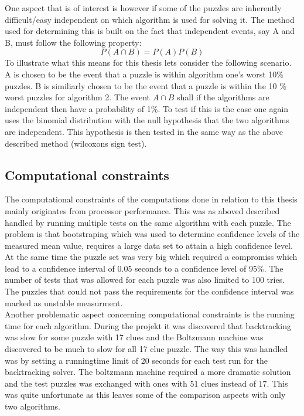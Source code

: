 \documentclass[a4paper,11pt]{kth-mag}
\begin{document}
One aspect that is of interest is however if some of the puzzles are inherently difficult/easy independent on which algorithm is used for solving it.
The method used for determining this is built on the fact that independent events, say A and B, must follow the following property:
\[
P(A \cap B) = P(A) P(B)
\] 
To illustrate what this means for this thesis lets consider the following scenario.
A is chosen to be the event that a puzzle is within algorithm one's worst 10\% puzzles.
B is similiarly chosen to be the event that a puzzle is within the 10 \% worst puzzles for algorithm 2.
The event $A \cap B$ shall if the algorithms are independent then have a probability of 1\%.
To test if this is the case one again uses the binomial distribution with the null hypothesis that the two algorithms are independent.
This hypothesis is then tested in the same way as the above described method (wilcoxons sign test).

\FloatBarrier
\subsection{Computational constraints}
The computational constraints of the computations done in relation to this thesis mainly originates from processor performance.
This was as aboved described handled by running multiple tests on the same algorithm with each puzzle.
The problem is that bootstraping which was used to determine confidence levels of the measured mean value, requires a large data set to attain a high confidence level. 
At the same time the puzzle set was very big which required a compromiss which lead to a confidence interval of 0.05 seconds to a confidence level of 95\%. The number of tests that was allowed for each puzzle was also limited to 100 tries.
The puzzles that could not pass the requirements for the confidence interval was marked as unstable measurment.
\\
Another problematic aspect concerning computational constraints is the running time for each algorithm.
During the projekt it was discovered that backtracking was slow for some puzzle with 17 clues and the Boltzmann machine was discovered to be much to slow for all 17 clue puzzle.
The way this was handled was by setting a runningtime limit of 20 seconds for each test run for the backtracking solver.
The boltzmann machine required a more dramatic solution and the test puzzles was exchanged with ones with 51 clues instead of 17. 
This was quite unfortunate as this leaves some of the comparison aspects with only two algorithms.
\end{document}
